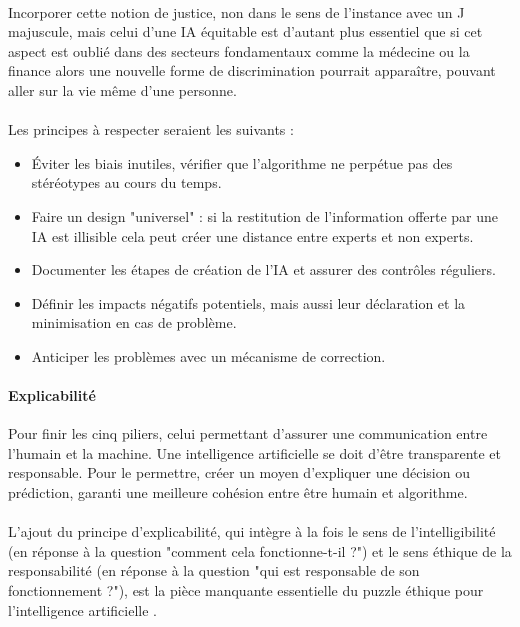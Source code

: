 \documentclass[10pt, french, a4paper]{article}
\begin{document}
\paragraph{}
Incorporer cette notion de justice, non dans le sens de l'instance avec un J majuscule, mais celui d'une IA équitable est d'autant plus essentiel que si cet aspect est oublié dans des secteurs fondamentaux comme la médecine ou la finance alors une nouvelle forme de discrimination pourrait apparaître, pouvant aller sur la vie même d'une personne.

\paragraph{}
Les principes à respecter seraient les suivants :
\begin{itemize}
    \item Éviter les biais inutiles, vérifier que l'algorithme ne perpétue pas des stéréotypes au cours du temps.
    \item Faire un design "universel" : si la restitution de l'information offerte par une IA est illisible cela peut créer une distance entre experts et non experts.
    \item Documenter les étapes de création de l'IA et assurer des contrôles réguliers.
    \item Définir les impacts négatifs potentiels, mais aussi leur déclaration et la minimisation en cas de problème.
    \item Anticiper les problèmes avec un mécanisme de correction.
\end{itemize}

\paragraph{Explicabilité}
Pour finir les cinq piliers, celui permettant d'assurer une communication entre l'humain et la machine. Une intelligence artificielle se doit d'être transparente et responsable. Pour le permettre, créer un moyen d'expliquer une décision ou prédiction, garanti une meilleure cohésion entre être humain et algorithme.

\paragraph{}
L'ajout du principe d'explicabilité, qui intègre à la fois le sens de l'intelligibilité (en réponse à la question "comment cela fonctionne-t-il ?") et le sens éthique de la responsabilité (en réponse à la question "qui est responsable de son fonctionnement ?"), est la pièce manquante essentielle du puzzle éthique pour l'intelligence artificielle \citep{floridi_unified_2019}.
\end{document}
